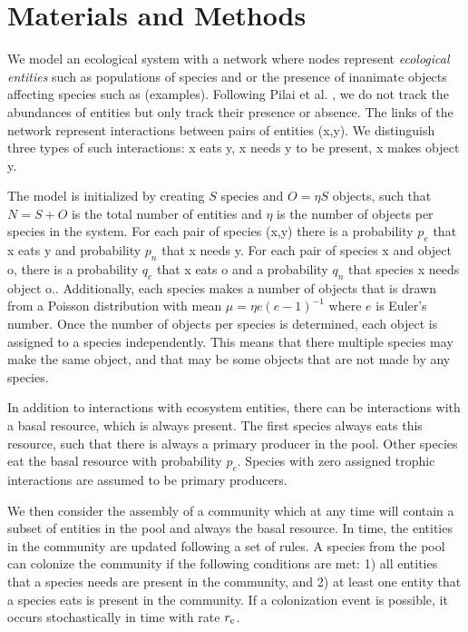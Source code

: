 \documentclass[9pt,twocolumn,twoside]{pnas-new}
\newcommand{\rr}[1]{{\rm #1}}
\begin{document}
\section*{Materials and Methods}
  \footnotesize{
  We model an ecological system with a network where nodes represent \emph{ecological entities} such as populations of species and or the presence of inanimate objects affecting species such as (examples).
  Following Pilai et al. \cite{Pillai2011}, we do not track the abundances of entities but only track their presence or absence.
  The links of the network represent interactions between pairs of entities (x,y).
  We distinguish three types of such interactions: x eats y, x needs y to be present, x makes object y.


  The model is initialized by creating $S$ species and $O = \eta S$ objects, such that $N=S+O$ is the total number of entities and $\eta$ is the number of objects per species in the system.
  For each pair of species (x,y) there is a probability $p_e$ that x eats y and probability $p_n$ that x needs y.
  For each pair of species x and object o, there is a probability $q_e$ that x eats o and a probability $q_n$ that species x needs object o..
  Additionally, each species makes a number of objects that is drawn from a Poisson distribution with mean $\mu = \eta e(e-1)^{-1}$ where $e$ is Euler's number.
  Once the number of objects per species is determined, each object is assigned to a species independently.
  This means that there multiple species may make the same object, and that may be some objects that are not made by any species.

  In addition to interactions with ecosystem entities, there can be interactions with a basal resource, which is always present.
  The first species always eats this resource, such that there is always a primary producer in the pool.
  Other species eat the basal resource with probability $p_e$.
  Species with zero assigned trophic interactions are assumed to be primary producers.

  We then consider the assembly of a community which at any time will contain a subset of entities in the pool and always the basal resource.
  In time, the entities in the community are updated following a set of rules.
  A species from the pool can colonize the community if the following conditions are met:
  1) all entities that a species needs are present in the community, and
  2) at least one entity that a species eats is present in the community.
  If a colonization event is possible, it occurs stochastically in time with rate $r_\rr{c}$.

}
\end{document}
